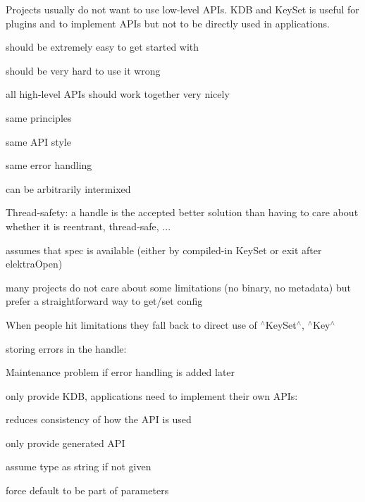 Projects usually do not want to use low-\/level A\+P\+Is. {\ttfamily K\+DB} and {\ttfamily Key\+Set} is useful for plugins and to implement A\+P\+Is but not to be directly used in applications.


\begin{DoxyEnumerate}
\item should be extremely easy to get started with
\item should be very hard to use it wrong
\item all high-\/level A\+P\+Is should work together very nicely
\begin{DoxyItemize}
\item same principles
\item same A\+PI style
\item same error handling
\item can be arbitrarily intermixed
\end{DoxyItemize}
\end{DoxyEnumerate}


\begin{DoxyItemize}
\item Thread-\/safety\+: a handle is the accepted better solution than having to care about whether it is reentrant, thread-\/safe, ...
\item assumes that spec is available (either by compiled-\/in {\ttfamily Key\+Set} or exit after elektra\+Open)
\item many projects do not care about some limitations (no binary, no metadata) but prefer a straightforward way to get/set config
\item When people hit limitations they fall back to direct use of $^\wedge$\+Key\+Set$^\wedge$, $^\wedge$\+Key$^\wedge$
\end{DoxyItemize}


\begin{DoxyItemize}
\item storing errors in the handle\+:
\begin{DoxyItemize}
\item Maintenance problem if error handling is added later
\end{DoxyItemize}
\item only provide {\ttfamily K\+DB}, applications need to implement their own A\+P\+Is\+:
\begin{DoxyItemize}
\item reduces consistency of how the A\+PI is used
\end{DoxyItemize}
\item only provide generated A\+PI
\item assume type as {\ttfamily string} if not given
\item force {\ttfamily default} to be part of parameters
\end{DoxyItemize}

